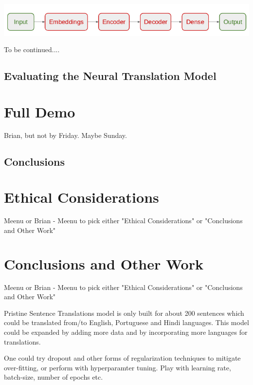 \documentclass{llncs}
\begin{document}
	\begin{minipage}{\linewidth}
		\begin{center}
			\includegraphics[width=\linewidth]{architecture.png}
			\label{fig:Model Architectture}
		\end{center}
	\end{minipage}
	\afterpage{\clearpage}


	To be continued....
	
	
	\subsection{Evaluating the Neural Translation Model}
	
	\section{Full Demo}
	Brian, but not by Friday. Maybe Sunday.
	
	\subsection{Conclusions}
	
	\section{Ethical Considerations}
	Meenu or Brian - Meenu to pick either "Ethical Considerations" or "Conclusions and Other Work"
	
	
	\section{Conclusions and Other Work}
	Meenu or Brian - Meenu to pick either "Ethical Considerations" or "Conclusions and Other Work"
	
	Pristine Sentence Translations model is only built for about 200 sentences which could be translated from/to English, Portuguese and Hindi languages. This model could be expanded by adding more data and by incorporating more languages for translations.
	
	One could try dropout and other forms of regularization techniques to mitigate over-fitting, or perform with hyperparamter tuning. Play with learning rate, batch-size, number of epochs etc.
	
\end{document}
